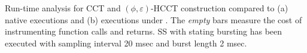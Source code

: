 \label{fig:hcct-slowdown} Run-time analysis for CCT and $(\phi,\varepsilon)$-HCCT construction compared to (a) native executions and (b) executions under \gprof. The {\em empty} bars measure the cost of instrumenting function calls and returns. SS with stating bursting has been executed with sampling interval 20 msec and burst length 2 msec.
